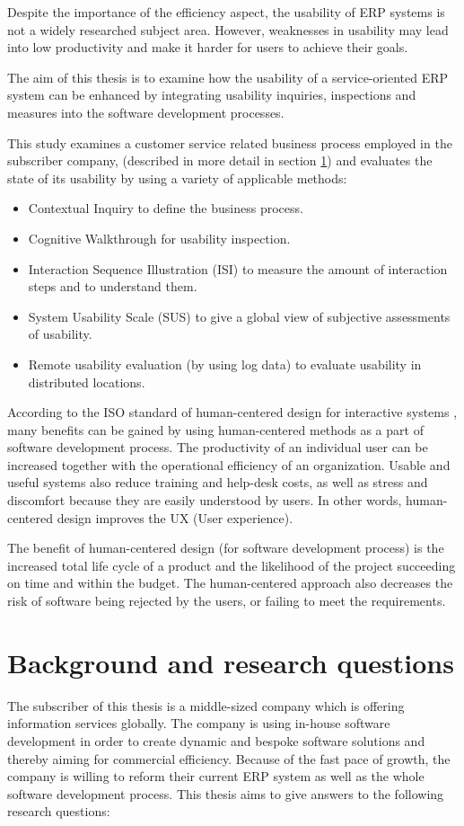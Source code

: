 \documentclass[12pt,a4paper,oneside,pdftex]{report}
\begin{document}
Despite the importance of the efficiency aspect, the usability of ERP systems is not a widely researched subject area. However, weaknesses in usability may lead into low productivity and make it harder for users to achieve their goals.\cite{RefWorks:2} 

The aim of this thesis is to examine how the usability of a service-oriented ERP system can be enhanced by integrating usability inquiries, inspections and measures into the software development processes. 


This study examines a customer service related business process employed in the subscriber company, (described in more detail in section \ref{sec:background}) and evaluates the state of its usability by using a variety of applicable methods:
\begin{itemize}
\item Contextual Inquiry to define the business process.
\item Cognitive Walkthrough for usability inspection.
\item Interaction Sequence Illustration (ISI) to measure the amount of interaction steps and to understand them.
\item System Usability Scale (SUS) to give a global view of subjective assessments of usability.
\item Remote usability evaluation (by using log data) to evaluate usability in distributed locations.
\end{itemize}

\indent According to the ISO standard of human-centered design for interactive systems \cite{RefWorks:16}, many benefits can be gained by using human-centered methods as a part of software development process. The productivity of an individual user can be increased together with the operational efficiency of an organization. Usable and useful systems also reduce training and help-desk costs, as well as stress and discomfort because they are easily understood by users. In other words, human-centered design improves the UX (User experience). \cite{RefWorks:16}

The benefit of human-centered design (for software development process) is the increased total life cycle of a product and the likelihood of the project succeeding on time and within the budget. The human-centered approach also decreases the risk of software being rejected by the users, or failing to meet the requirements. \cite{RefWorks:16}

\section{Background and research questions}
\label{sec:background}
The subscriber of this thesis is a middle-sized company which is offering information services globally. The company is using in-house software development in order to create dynamic and bespoke software solutions and thereby aiming for commercial efficiency.  Because of the fast pace of growth, the company is willing to reform their current ERP system as well as the whole software development process. This thesis aims to give answers to the following research questions:
\end{document}
